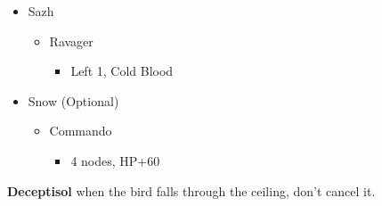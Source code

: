 \begin{multicols}{2}
\begin{menu}
  \begin{itemize}
    \crystarium
    \begin{itemize}
      \item Sazh
            \begin{itemize}
              \item Ravager
                    \begin{itemize}
                      \item Left 1, Cold Blood
                    \end{itemize}
            \end{itemize}
      \item Snow (Optional)
            \begin{itemize}
              \item Commando
                    \begin{itemize}
                      \item 4 nodes, HP+60
                    \end{itemize}
            \end{itemize}
    \end{itemize}
  \end{itemize}
\end{menu}

\textbf{Deceptisol} when the bird falls through the ceiling, don't cancel it.


\end{multicols}
